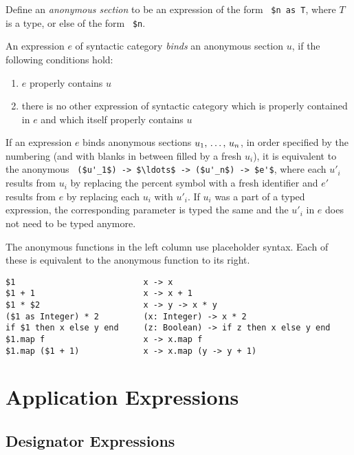 Define an {\em anonymous section} to be an expression of the form ~\lstinline[mathescape=false]!$n as T!, where $T$ is a type, or else of the form ~\lstinline[mathescape=false]!$n!. 

An expression $e$ of syntactic category  {\em binds} an anonymous section $u$, if the following conditions hold:
\begin{enumerate}
  \item $e$ properly contains $u$
  \item there is no other expression of syntactic category  which is properly contained in $e$ and which itself properly contains $u$
\end{enumerate}

If an expression $e$ binds anonymous sections $u_1 ,\, \ldots ,\, u_n$, in order specified by the numbering (and with blanks in between filled by a fresh $u_i$), it is equivalent to the anonymous ~\lstinline!($u'_1$) -> $\ldots$ -> ($u'_n$) -> $e'$!, where each $u'_i$ results from $u_i$ by replacing the percent symbol with a fresh identifier and $e'$ results from $e$ by replacing each $u_i$ with $u'_i$. If $u_i$ was a part of a typed expression, the corresponding parameter is typed the same and the $u'_i$ in $e$ does not need to be typed anymore. 

\example The anonymous functions in the left column use placeholder syntax. Each of these is equivalent to the anonymous function to its right. 
\begin{lstlisting}[mathescape=false]
$1                          x -> x
$1 + 1                      x -> x + 1
$1 * $2                     x -> y -> x * y
($1 as Integer) * 2         (x: Integer) -> x * 2
if $1 then x else y end     (z: Boolean) -> if z then x else y end
$1.map f                    x -> x.map f
$1.map ($1 + 1)             x -> x.map (y -> y + 1)
\end{lstlisting} 






\section{Application Expressions}







\subsection{Designator Expressions}
\label{sec:designators}

